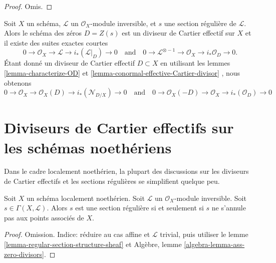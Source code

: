 \begin{proof}
Omis.
\end{proof}

\begin{remark}
\label{remark-ses-regular-section}
Soit  $X$  un schéma,  $\mathcal{L}$  un  $\mathcal{O}_X$-module inversible, et
 $s$  une section régulière de  $\mathcal{L}$. Alors le schéma des zéros
 $D = Z(s)$  est un diviseur de Cartier effectif sur  $X$  et il existe des
suites exactes courtes
$$
0 \to \mathcal{O}_X \to \mathcal{L} \to i_*(\mathcal{L}|_D) \to 0
\quad\text{and}\quad
0 \to \mathcal{L}^{\otimes -1} \to \mathcal{O}_X \to i_*\mathcal{O}_D \to 0.
$$
Étant donné un diviseur de Cartier effectif  $D \subset X$  en utilisant les lemmes
 \ref{lemma-characterize-OD}  et  \ref{lemma-conormal-effective-Cartier-divisor} , nous obtenons
$$
0 \to \mathcal{O}_X \to \mathcal{O}_X(D) \to i_*(\mathcal{N}_{D/X}) \to 0
\quad\text{and}\quad
0 \to \mathcal{O}_X(-D) \to \mathcal{O}_X \to i_*(\mathcal{O}_D) \to 0
$$
\end{remark}






\section{Diviseurs de Cartier effectifs sur les schémas noethériens}
\label{section-Noetherian-effective-Cartier}

\noindent
Dans le cadre localement noethérien, la plupart des discussions sur les diviseurs
de Cartier effectifs et les sections régulières se simplifient quelque peu.

\begin{lemma}
\label{lemma-regular-section-associated-points}
Soit  $X$  un schéma localement noethérien. Soit  $\mathcal{L}$  un
 $\mathcal{O}_X$-module inversible. Soit  $s \in \Gamma(X, \mathcal{L})$. Alors  $s$  est une
section régulière si et seulement si  $s$  ne s'annule pas aux points
associés de  $X$.
\end{lemma}

\begin{proof}
Omission. Indice: réduire au cas affine et  $\mathcal{L}$  trivial, puis utiliser le
lemme  \ref{lemma-regular-section-structure-sheaf}  et Algèbre, lemme  \ref{algebra-lemma-ass-zero-divisors}.
\end{proof}


